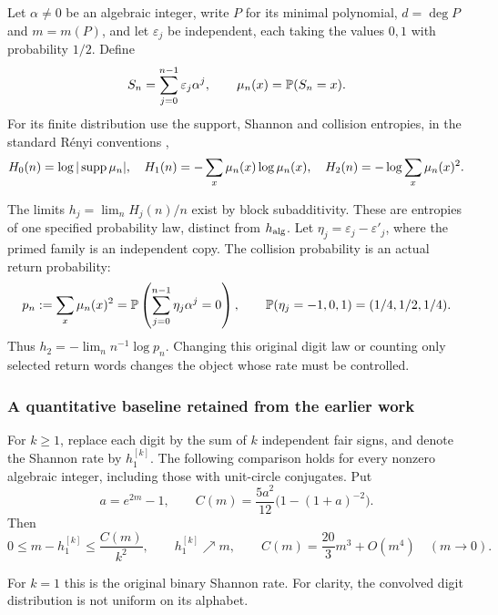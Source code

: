 \begin{definition}\label{fo:binary-law}
Let $\alpha\ne0$ be an algebraic integer, write $P$ for its minimal polynomial, $d=\deg P$ and $m=m(P)$, and let $\varepsilon_j$ be independent, each taking the values $0,1$ with probability $1/2$.
Define
\[
 S_n=\sum_{j=0}^{n-1}\varepsilon_j\alpha^j,
 \qquad \mu_n(x)=\mathbb P(S_n=x).
\]
For its finite distribution use the support, Shannon and collision entropies, in the standard R\'enyi conventions \cite[p.~1]{Li26},
\[
 H_0(n)=\log|\operatorname{supp}\mu_n|,\quad
 H_1(n)=-\sum_x\mu_n(x)\log\mu_n(x),\quad
 H_2(n)=-\log\sum_x\mu_n(x)^2.
\]
\end{definition}
The limits $h_j=\lim_n H_j(n)/n$ exist by block subadditivity.
These are entropies of one specified probability law, distinct from $h_{\rm alg}$.
Let $\eta_j=\varepsilon_j-\varepsilon'_j$, where the primed family is an independent copy.
The collision probability is an actual return probability:
\begin{equation}\label{fo:collision-return}
 p_n:=\sum_x\mu_n(x)^2
 =\mathbb P\left(\sum_{j=0}^{n-1}\eta_j\alpha^j=0\right),
 \qquad \mathbb P(\eta_j=-1,0,1)=(1/4,1/2,1/4).
\end{equation}
Thus $h_2=-\lim_n n^{-1}\log p_n$.
Changing this original digit law or counting only selected return words changes the object whose rate must be controlled.

\subsubsection{A quantitative baseline retained from the earlier work}
\begin{theorem}\label{fo:convolution-comparison}
For $k\ge1$, replace each digit by the sum of $k$ independent fair signs, and denote the Shannon rate by $h_1^{[k]}$.
The following comparison holds for every nonzero algebraic integer, including those with unit-circle conjugates.
Put
\[
 a=e^{2m}-1,\qquad C(m)=\frac{5a^2}{12}\bigl(1-(1+a)^{-2}\bigr).
\]
Then
\begin{equation}\label{fo:convolution-rate}
 0\le m-h_1^{[k]}\le\frac{C(m)}{k^2},\qquad
 h_1^{[k]}\nearrow m,\qquad
 C(m)=\frac{20}{3}m^3+O(m^4)\quad(m\to0).
\end{equation}
\end{theorem}
For $k=1$ this is the original binary Shannon rate.
For clarity, the convolved digit distribution is not uniform on its alphabet.

